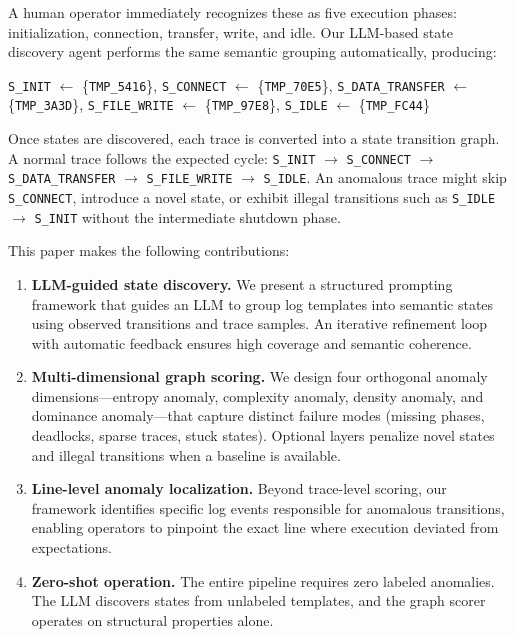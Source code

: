 \documentclass[11pt]{article}
\begin{document}
A human operator immediately recognizes these as five execution phases: initialization, connection, transfer, write, and idle. Our LLM-based state discovery agent performs the same semantic grouping automatically, producing:

\begin{center}
\texttt{S\_INIT} $\leftarrow$ \{\texttt{TMP\_5416}\}, \quad
\texttt{S\_CONNECT} $\leftarrow$ \{\texttt{TMP\_70E5}\}, \quad
\texttt{S\_DATA\_TRANSFER} $\leftarrow$ \{\texttt{TMP\_3A3D}\}, \quad
\texttt{S\_FILE\_WRITE} $\leftarrow$ \{\texttt{TMP\_97E8}\}, \quad
\texttt{S\_IDLE} $\leftarrow$ \{\texttt{TMP\_FC44}\}
\end{center}

Once states are discovered, each trace is converted into a state transition graph. A normal trace follows the expected cycle: \texttt{S\_INIT} $\rightarrow$ \texttt{S\_CONNECT} $\rightarrow$ \texttt{S\_DATA\_TRANSFER} $\rightarrow$ \texttt{S\_FILE\_WRITE} $\rightarrow$ \texttt{S\_IDLE}. An anomalous trace might skip \texttt{S\_CONNECT}, introduce a novel state, or exhibit illegal transitions such as \texttt{S\_IDLE} $\rightarrow$ \texttt{S\_INIT} without the intermediate shutdown phase.

This paper makes the following contributions:

\begin{enumerate}[leftmargin=*,itemsep=2pt]
    \item \textbf{LLM-guided state discovery.} We present a structured prompting framework that guides an LLM to group log templates into semantic states using observed transitions and trace samples. An iterative refinement loop with automatic feedback ensures high coverage and semantic coherence.
    
    \item \textbf{Multi-dimensional graph scoring.} We design four orthogonal anomaly dimensions---entropy anomaly, complexity anomaly, density anomaly, and dominance anomaly---that capture distinct failure modes (missing phases, deadlocks, sparse traces, stuck states). Optional layers penalize novel states and illegal transitions when a baseline is available.
    
    \item \textbf{Line-level anomaly localization.} Beyond trace-level scoring, our framework identifies specific log events responsible for anomalous transitions, enabling operators to pinpoint the exact line where execution deviated from expectations.
    
    \item \textbf{Zero-shot operation.} The entire pipeline requires zero labeled anomalies. The LLM discovers states from unlabeled templates, and the graph scorer operates on structural properties alone.
\end{enumerate}
\end{document}
